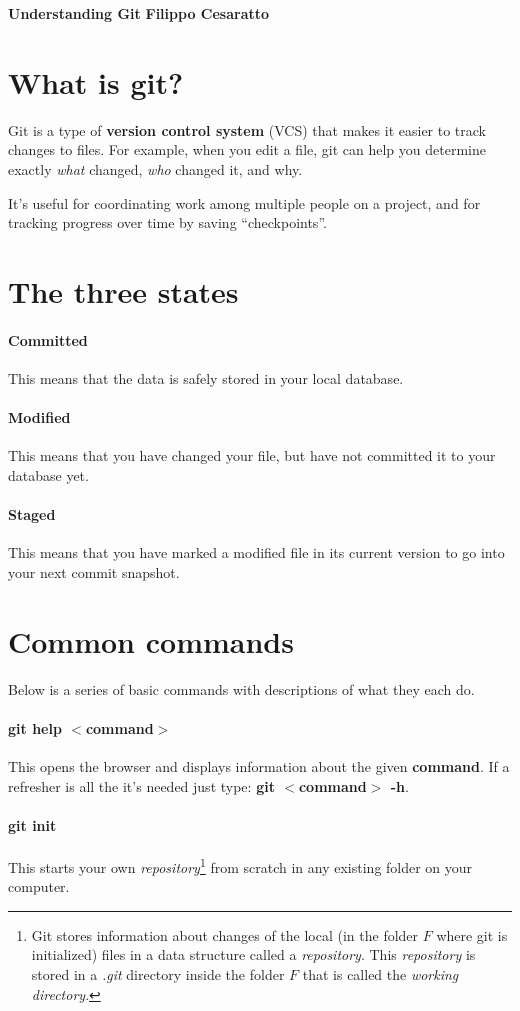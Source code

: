 \documentclass[a4paper, 11pt]{article}
\begin{document}
\noindent
\large\textbf{Understanding Git} \hfill \textbf{Filippo Cesaratto} \\
\normalsize

\section*{What is git?}
Git is a type of \textbf{version control system} (VCS) that makes it easier to track changes to files. For example, when you edit a file, git can help you determine exactly \emph{what} changed, \emph{who} changed it, and why.

It's useful for coordinating work among multiple people on a project, and for tracking progress over time by saving ``checkpoints''. 

\section*{The three states}
\paragraph{Committed} This means that the data is safely stored in your local database.
\paragraph{Modified} This means that you have changed your file, but have not committed it to your database yet.
\paragraph{Staged} This means that you have marked a modified file in its current version to go into your next commit snapshot.

\section*{Common commands}
Below is a series of basic commands with descriptions of what they each do.

\paragraph{git help $<$command$>$} This opens the browser and displays information about the given \textbf{command}. If a refresher is all the it's needed just type: \textbf{git $<$command$>$ -h}.

\paragraph{git init}
This starts your own \emph{repository}\footnote{Git stores information about changes of the local (in the folder $F$ where git is initialized) files in a data structure called a \emph{repository}. This \emph{repository} is stored in a \emph{.git} directory inside the folder $F$ that is called the \emph{working directory}.} from scratch in any existing folder on your computer.
\end{document}
